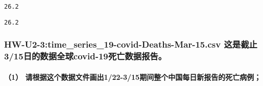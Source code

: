 \documentclass[11pt]{article}
\makeatletter
\newcommand{\boxspacing}{\kern\kvtcb@left@rule\kern\kvtcb@boxsep}
\newcommand{\prompt}[4]{
        \ttfamily\llap{{\color{#2}[#3]:\hspace{3pt}#4}}\vspace{-\baselineskip}
    }
\makeatother
\begin{document}
            \begin{tcolorbox}[breakable, size=fbox, boxrule=.5pt, pad at break*=1mm, opacityfill=0]
\prompt{Out}{outcolor}{11}{\boxspacing}
\begin{Verbatim}[commandchars=\\\{\}]
26.2
\end{Verbatim}
\end{tcolorbox}
        
            \begin{tcolorbox}[breakable, size=fbox, boxrule=.5pt, pad at break*=1mm, opacityfill=0]
\prompt{Out}{outcolor}{11}{\boxspacing}
\begin{Verbatim}[commandchars=\\\{\}]
26.2
\end{Verbatim}
\end{tcolorbox}
        
    \hypertarget{hw-u2-3time_series_19-covid-deaths-mar-15.csv-ux8fd9ux662fux622aux6b62315ux65e5ux7684ux6570ux636eux5168ux7403covid-19ux6b7bux4ea1ux6570ux636eux62a5ux544a}{%
\subsubsection{HW-U2-3:time\_series\_19-covid-Deaths-Mar-15.csv
这是截止3/15日的数据全球covid-19死亡数据报告。}\label{hw-u2-3time_series_19-covid-deaths-mar-15.csv-ux8fd9ux662fux622aux6b62315ux65e5ux7684ux6570ux636eux5168ux7403covid-19ux6b7bux4ea1ux6570ux636eux62a5ux544a}}

    \hypertarget{ux8bf7ux6839ux636eux8fd9ux4e2aux6570ux636eux6587ux4ef6ux753bux51fa122-315ux671fux95f4ux6574ux4e2aux4e2dux56fdux6bcfux65e5ux65b0ux62a5ux544aux7684ux6b7bux4ea1ux75c5ux4f8b}{%
\paragraph{（1）
请根据这个数据文件画出1/22-3/15期间整个中国每日新报告的死亡病例；}\label{ux8bf7ux6839ux636eux8fd9ux4e2aux6570ux636eux6587ux4ef6ux753bux51fa122-315ux671fux95f4ux6574ux4e2aux4e2dux56fdux6bcfux65e5ux65b0ux62a5ux544aux7684ux6b7bux4ea1ux75c5ux4f8b}}
\end{document}

